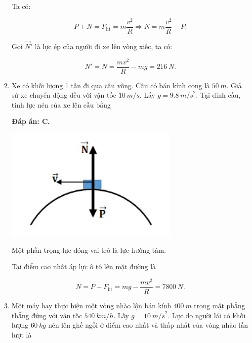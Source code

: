 \begin{enumerate}[label=\bfseries Câu \arabic*:]
{		Ta có:
		
		$$P + N = F_\text{ht} = m \dfrac{v^2}{R} \Rightarrow N = m \dfrac{v^2}{R} - P.$$
		
		Gọi $\vec N'$ là lực ép của người đi xe lên vòng xiếc, ta có:
		
		$$N' = N = \dfrac{mv^2}{R} - mg = \SI{216}{N}.$$
	}
	\item {}
	
	
	{Xe có khối lượng 1 tấn đi qua cầu vồng. Cầu có bán kính cong là $\SI{50}{m}$. Giả sử xe chuyển động đều với vận tốc $\SI{10}{m/s}$. Lấy $g = \SI{9,8}{m/s}^2$. Tại đỉnh cầu, tính lực nén của xe lên cầu bằng
	}
	
	\hideall
	{	
		\textbf{Đáp án: C.}
		
		\begin{center}
			\includegraphics[scale=0.6]{../figs/VN10-2022-PH-TP0005-3.jpg}
		\end{center}
		
		Một phần trọng lực đóng vai trò là lực hướng tâm.
		
		Tại điểm cao nhất áp lực ô tô lên mặt đường là
		
		$$ N = P - F_\text{ht} = mg - \dfrac{mv^2}{R} = \SI{7800}{N}.$$
	}
	\item {}
	
	
	{Một máy bay thực hiện một vòng nhào lộn bán kính $\SI{400}{m}$ trong mặt phẳng thẳng đứng với vận tốc $\SI{540}{km/h}$. Lấy $g = \SI{10}{m/s}^2$. Lực do người lái có khối lượng $\SI{60}{kg}$ nén lên ghế ngồi ở điểm cao nhất và thấp nhất của vòng nhào lần lượt là
	}
	

\end{enumerate}
